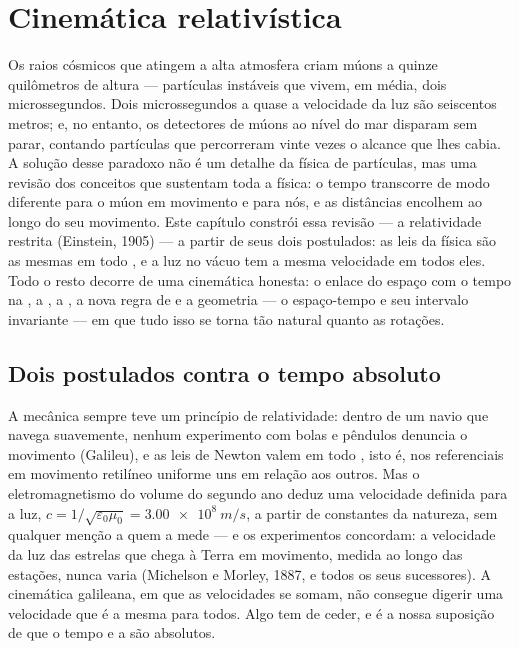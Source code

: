 \chapter{Cinemática relativística}\label{ch:b3:relativistic-kinematics}

Os raios cósmicos que atingem a alta atmosfera criam múons a quinze
quilômetros de altura --- partículas instáveis que vivem, em média,
dois microssegundos. Dois microssegundos a quase a velocidade da luz
são seiscentos metros; e, no entanto, os detectores de múons ao nível
do mar disparam sem parar, contando partículas que percorreram vinte
vezes o alcance que lhes cabia. A solução desse paradoxo não é um
detalhe da física de partículas, mas uma revisão dos conceitos que
sustentam toda a física: o tempo transcorre de modo diferente para o
múon em movimento e para nós, e as distâncias encolhem ao longo do seu
movimento. Este capítulo constrói essa revisão --- a relatividade
restrita (Einstein, 1905) --- a partir de seus dois postulados: as
leis da física são as mesmas em todo , e a luz no
vácuo tem a mesma velocidade em todos eles. Todo o resto decorre de
uma cinemática honesta: o enlace do espaço com o tempo na , a , a , a nova
regra de  e a geometria --- o espaço-tempo e
seu intervalo invariante --- em que tudo isso se torna tão natural
quanto as rotações.

\section{Dois postulados contra o tempo absoluto}

\begin{remark}\label{rem:b3:relativistic-kinematics:conflict}
A mecânica sempre teve um princípio de relatividade: dentro de um navio
que navega suavemente, nenhum experimento com bolas e pêndulos
denuncia o movimento (Galileu), e as leis de Newton valem em todo
\emph{}, isto é, nos referenciais em movimento
retilíneo uniforme uns em relação aos outros. Mas o eletromagnetismo do
volume do segundo ano deduz uma velocidade definida para a luz,
$c = 1/\sqrt{\varepsilon_0\mu_0} =
\qty{3.00e8}{m/s}$, a partir de constantes da natureza, sem qualquer
menção a quem a mede --- e os experimentos concordam: a velocidade da
luz das estrelas que chega à Terra em movimento, medida ao longo das
estações, nunca varia (Michelson e Morley, 1887, e todos os seus
sucessores). A cinemática galileana, em que as velocidades se somam,
não consegue digerir uma velocidade que é a mesma para todos. Algo tem
de ceder, e é a nossa suposição de que o tempo e a  são
absolutos.
\end{remark}

